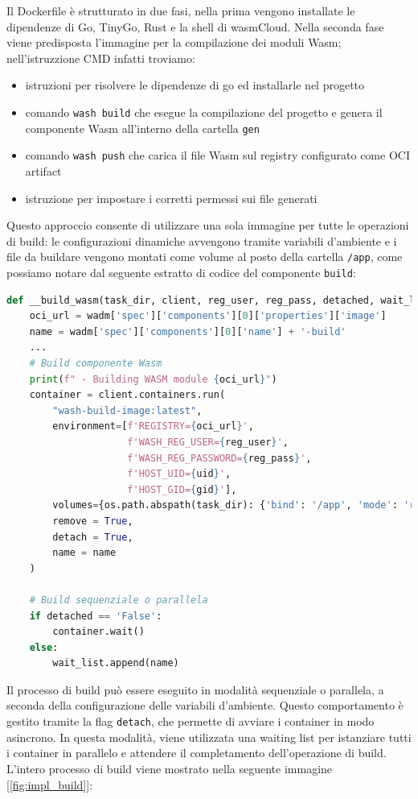 Il Dockerfile è strutturato in due fasi, nella prima vengono installate le dipendenze di Go, TinyGo, Rust e la shell di wasmCloud. Nella seconda fase viene predisposta l'immagine per la compilazione dei moduli Wasm; nell'istruzzione CMD infatti troviamo:
\begin{itemize}
    \item istruzioni per risolvere le dipendenze di go ed installarle nel progetto
    \item comando \texttt{wash build} che esegue la compilazione del progetto e genera il componente Wasm all'interno della cartella \texttt{gen}
    \item comando \texttt{wash push} che carica il file Wasm sul registry configurato come OCI artifact
    \item istruzione per impostare i corretti permessi sui file generati
\end{itemize}

Questo approccio consente di utilizzare una sola immagine per tutte le operazioni di build: le configurazioni dinamiche avvengono tramite variabili d'ambiente e i file da buildare vengono montati come volume al posto della cartella \texttt{/app}, come possiamo notare dal seguente estratto di codice del componente \texttt{build}:

\begin{lstlisting}[language=python, caption={Build componente Wasm con Docker}, captionpos=b, label={code:build}]
def __build_wasm(task_dir, client, reg_user, reg_pass, detached, wait_list):
    oci_url = wadm['spec']['components'][0]['properties']['image']
    name = wadm['spec']['components'][0]['name'] + '-build'
    ...
    # Build componente Wasm
    print(f" - Building WASM module {oci_url}")
    container = client.containers.run(
        "wash-build-image:latest",
        environment=[f'REGISTRY={oci_url}',
                     f'WASH_REG_USER={reg_user}',
                     f'WASH_REG_PASSWORD={reg_pass}',
                     f'HOST_UID={uid}',
                     f'HOST_GID={gid}'],
        volumes={os.path.abspath(task_dir): {'bind': '/app', 'mode': 'rw'}},
        remove = True,
        detach = True,
        name = name
    )
    
    # Build sequenziale o parallela
    if detached == 'False':
        container.wait()
    else:
        wait_list.append(name)
\end{lstlisting}

Il processo di build può essere eseguito in modalità sequenziale o parallela, a seconda della configurazione delle variabili d'ambiente. Questo comportamento è gestito tramite la flag \texttt{detach}, che permette di avviare i container in modo asincrono. In questa modalità, viene utilizzata una waiting list per istanziare tutti i container in parallelo e attendere il completamento dell'operazione di build.\\
L'intero processo di build viene mostrato nella seguente immagine [\ref{fig:impl_build}]:

